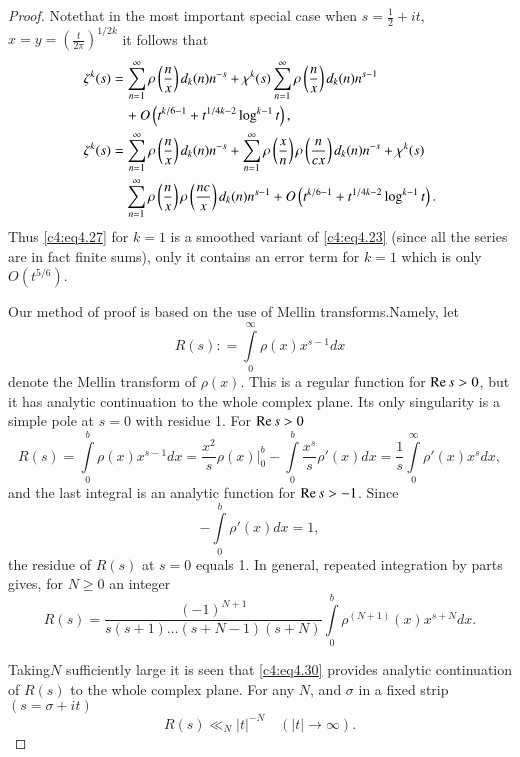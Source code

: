 \begin{proof}
  Note\pageoriginale that in the most important special case when $s=
  \frac{1}{2} + it$, $x= y= \left(\frac{t}{2 \pi} \right)^{1/2k}$ it
  follows that 
  \begin{align}
    \zeta^k (s) & = \sum_{n=1}^\infty \rho \left(\frac{n}{x}
    \right)d_k (n) n^{-s} + \chi^k (s) \sum_{n=1}^\infty \rho
    \left(\frac{n}{x} \right) d_k (n) n^{s-1}\label{c4:eq4.27}\\
    & \quad+ O\left(t^{k/6-1}+ t^{1/4 k-2} \log^{k-1}t\right),\notag \\ 
    \zeta^k (s) & = \sum_{n=1}^{\infty} \rho
    \left(\frac{n}{x} \right)d_k (n) n^{-s} + \sum_{n=1}^\infty \rho
    \left(\frac{x}{n} \right) \rho \left(\frac{n}{cx}\right) d_k (n)
    n^{-s} + \chi^k (s)\label{c4:eq4.28}\\
    &\quad \sum_{n=1}^\infty \rho\left(\frac{n}{x}
    \right) \rho \left(\frac{nc}{x}\right)d_k (n) n^{s-1} +
    O\left(t^{k/6-1}+ t^{1/4 k-2} \log^{k-1}t\right).\notag
  \end{align}
  Thus \eqref{c4:eq4.27} for $k=1$ is a smoothed variant of
  \eqref{c4:eq4.23} (since all the series are in fact finite sums),
  only it contains an error term for $k=1$ which is only $O(t^{5/6})$.


Our method of proof is based on the use of Mellin transforms.\break Namely,
let
\begin{equation}
  R(s) : = \int\limits_0^\infty \rho (x) x^{s-1} dx \label{c4:eq4.29}
\end{equation}
denote the Mellin transform of $\rho (x)$. This is a regular function
for $\operatorname{Re} s> 0$, but it has analytic continuation to the whole complex
plane. Its only singularity is a simple pole at $s=0$ with residue
1. For $\operatorname{Re} s>0$
$$
R(s) = \int\limits_0^b \rho(x) x^{s-1}dx = \frac{x^2}{s} \rho (x)
\Bigg|_0^b- \int\limits_0^b \frac{x^s}{s} \rho' (x) dx = \frac{1}{s}
\int\limits_0^\infty \rho' (x) x^s dx,
$$
and the last integral is an analytic function for $\operatorname{Re} s > -1$. Since
$$
- \int\limits_0^b \rho' (x) dx =1,
$$
the residue of $R(s)$ at $s=0$ equals 1. In general, repeated
integration by parts gives, for $N \geq 0$ an integer
\begin{equation}
  R(s) = \frac{(-1)^{N+1}}{s(s+1) \ldots (s+N-1)(s+N)}\int\limits_0^b
  \rho^{(N+1)}(x) x^{s+N} dx.\label{c4:eq4.30} 
\end{equation}

Taking\pageoriginale $N$ sufficiently large it is seen that \eqref{c4:eq4.30}
provides analytic continuation of $R(s)$ to the whole complex
plane. For any $N$, and $\sigma$ in a fixed strip $(s = \sigma + it)$
\begin{equation}
  R(s) \ll_N |t|^{-N} \quad (|t|\to \infty).\label{c4:eq4.31}
\end{equation}


\end{proof}
